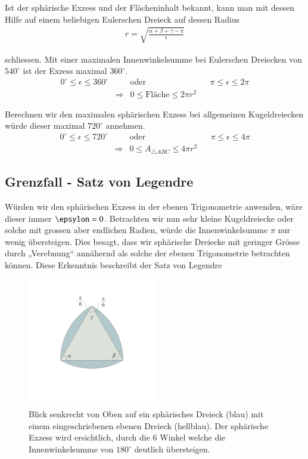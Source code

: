 \begin{refsection}
Ist der sphärische Exzess und der Flächeninhalt bekannt, kann man mit dessen Hilfe auf einem beliebigen Eulerschen Dreieck auf dessen Radius
\begin{align*}
r = \sqrt{\frac{\alpha + \beta + \gamma - \pi}{\epsilon}}
\end{align*}

schliessen. Mit einer maximalen Innenwinkelsumme bei Eulerschen Dreiecken von $540^{\circ}$ ist der Exzess maximal $360^{\circ}$.
\[
\begin{aligned}
0^{\circ} \le \epsilon \le 360^{\circ}
&
&\text{oder}
&
&\pi \le \epsilon \le 2\pi \\
&\Rightarrow
& 0 \le \text{Fläche} \le 2 \pi r^2
\end{aligned}
\]

Berechnen wir den maximalen sphärischen Exzess bei allgemeinen Kugeldreiecken würde dieser maximal $720^{\circ}$ annehmen.
\[
\begin{aligned}
0^{\circ} \le \epsilon \le 720^{\circ}
&
&\text{oder}
&
&\pi \le \epsilon \le 4\pi \\
&\Rightarrow
& 0 \le A_{\triangle{ ABC }} \le 4 \pi r^2
\end{aligned}
\]



\subsection{Grenzfall - Satz von Legendre}
Würden wir den sphärischen Exzess in der ebenen Trigonometrie anwenden, wäre dieser immer $\epsylon=0$. Betrachten wir nun sehr kleine Kugeldreiecke oder solche mit grossen aber endlichen Radien, würde die Innenwinkelsumme $\pi$ nur wenig übersteigen. Dies besagt, dass wir sphärische Dreiecke mit geringer Grösse durch „Verebnung“ annähernd als solche der ebenen Trigonometrie betrachten können. Diese Erkenntnis beschreibt der Satz von Legendre

\begin{figure}[htbp]
\centering
\includegraphics[width=0.5\textwidth]{kugel/SphaerischerExzess.jpg}
\caption{Blick senkrecht von Oben auf ein sphärisches Dreieck (blau) mit einem eingeschriebenen ebenen Dreieck (hellblau). Der sphärische Exzess wird ersichtlich, durch die 6 Winkel welche die Innenwinkelsumme von $180^{\circ}$ deutlich übersteigen.}
\end{figure}



\end{refsection}
